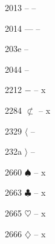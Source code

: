 \documentclass[11pt]{article}
\begin{document}

2013 -- -- \textendash

2014 --- -- \textemdash










203e \textasciimacron -- 

2044 \textfractionsolidus -- 









2212 \ensuremath{-} -- x%



2284 \ensuremath{\not\subset} -- x%

2329 \ensuremath{\langle} -- 

232a \ensuremath{\rangle} -- 

2660 \ensuremath{\spadesuit} -- x%

2663 \ensuremath{\clubsuit} -- x%

2665 \ensuremath{\heartsuit} -- x%

2666 \ensuremath{\diamondsuit} -- x%
\end{document}
